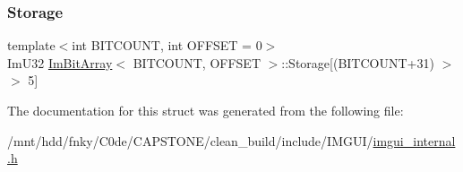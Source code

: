 \subsubsection{\texorpdfstring{Storage}{Storage}}
{\footnotesize\ttfamily template$<$int B\+I\+T\+C\+O\+U\+NT, int O\+F\+F\+S\+ET = 0$>$ \\
Im\+U32 \hyperlink{structImBitArray}{Im\+Bit\+Array}$<$ B\+I\+T\+C\+O\+U\+NT, O\+F\+F\+S\+ET $>$\+::Storage\mbox{[}(B\+I\+T\+C\+O\+U\+NT+31) $>$$>$ 5\mbox{]}}



The documentation for this struct was generated from the following file\+:\begin{DoxyCompactItemize}
\item 
/mnt/hdd/fnky/\+C0de/\+C\+A\+P\+S\+T\+O\+N\+E/clean\+\_\+build/include/\+I\+M\+G\+U\+I/\hyperlink{imgui__internal_8h}{imgui\+\_\+internal.\+h}\end{DoxyCompactItemize}
